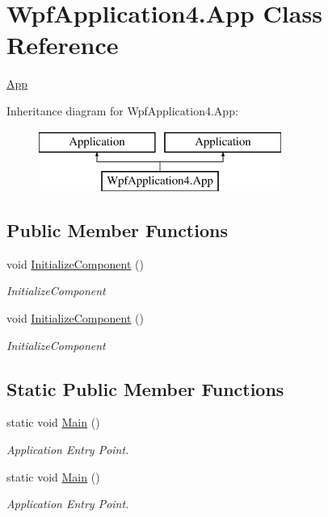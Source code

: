 \hypertarget{class_wpf_application4_1_1_app}{\section{Wpf\-Application4.\-App Class Reference}
\label{class_wpf_application4_1_1_app}
}


\hyperlink{class_wpf_application4_1_1_app}{App}  


Inheritance diagram for Wpf\-Application4.\-App\-:\begin{figure}[H]
\begin{center}
\leavevmode
\includegraphics[height=2.000000cm]{class_wpf_application4_1_1_app}
\end{center}
\end{figure}
\subsection*{Public Member Functions}
\begin{DoxyCompactItemize}
\item 
void \hyperlink{class_wpf_application4_1_1_app_a771c9d33fc561f332b66df12e2df001c}{Initialize\-Component} ()
\begin{DoxyCompactList}\small\item\em Initialize\-Component \end{DoxyCompactList}\item 
void \hyperlink{class_wpf_application4_1_1_app_a771c9d33fc561f332b66df12e2df001c}{Initialize\-Component} ()
\begin{DoxyCompactList}\small\item\em Initialize\-Component \end{DoxyCompactList}\end{DoxyCompactItemize}
\subsection*{Static Public Member Functions}
\begin{DoxyCompactItemize}
\item 
static void \hyperlink{class_wpf_application4_1_1_app_af9d156f9d05b42856f01e9d71fa7ae9a}{Main} ()
\begin{DoxyCompactList}\small\item\em Application Entry Point. \end{DoxyCompactList}\item 
static void \hyperlink{class_wpf_application4_1_1_app_af9d156f9d05b42856f01e9d71fa7ae9a}{Main} ()
\begin{DoxyCompactList}\small\item\em Application Entry Point. \end{DoxyCompactList}\end{DoxyCompactItemize}


